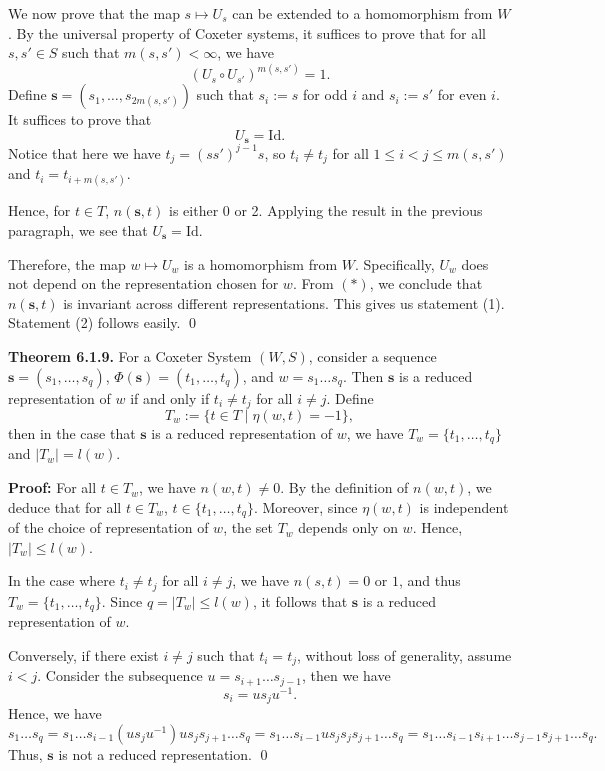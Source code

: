 \documentclass[../main.tex]{subfiles}
\begin{document}
We now prove that the map $s \mapsto U_s$ can be extended to a homomorphism from $W$. By the universal property of Coxeter systems, it suffices to prove that for all $s, s' \in S$ such that $m(s, s') < \infty$, we have
\[
(U_s \circ U_{s'})^{m(s, s')} = 1.
\]
Define $\mathbf{s} = (s_1, \dots, s_{2m(s, s')})$ such that $s_i := s$ for odd $i$ and $s_i := s'$ for even $i$. It suffices to prove that
\[
U_{\mathbf{s}} = \text{Id}.
\]
Notice that here we have $t_j = (ss')^{j-1} s$, so $t_i \neq t_j$ for all $1 \leq i < j \leq m(s, s')$ and $t_i = t_{i + m(s, s')}$.

Hence, for $t \in T$, $n(\mathbf{s}, t)$ is either 0 or 2. Applying the result in the previous paragraph, we see that $U_{\mathbf{s}} = \text{Id}$.

Therefore, the map $w \mapsto U_w$ is a homomorphism from $W$. Specifically, $U_w$ does not depend on the representation chosen for $w$. From $(*)$, we conclude that $n(\mathbf{s}, t)$ is invariant across different representations. This gives us statement (1). Statement (2) follows easily. \qed

\vspace{\baselineskip}

\noindent \textbf{Theorem 6.1.9.} For a Coxeter System $(W,S)$, consider a sequence $\mathbf{s} = (s_1, \dots, s_q)$, $\Phi(\mathbf{s}) = (t_1, \dots, t_q)$, and $w = s_1 \dots s_q$. Then $\mathbf{s}$ is a reduced representation of $w$ if and only if $t_i \neq t_j$ for all $i \neq j$. Define
\[
T_w := \{ t \in T \mid \eta(w, t) = -1 \},
\]
then in the case that $\mathbf{s}$ is a reduced representation of $w$, we have $T_w = \{ t_1, \dots, t_q \}$ and $|T_w| = l(w)$.

\vspace{0.5\baselineskip}

\noindent \textbf{Proof:} For all $t \in T_w$, we have $n(w, t) \neq 0$. By the definition of $n(w, t)$, we deduce that for all $t \in T_w$, $t \in \{ t_1, \dots, t_q \}$. Moreover, since $\eta(w, t)$ is independent of the choice of representation of $w$, the set $T_w$ depends only on $w$. Hence, $|T_w| \leq l(w)$.

In the case where $t_i \neq t_j$ for all $i \neq j$, we have $n(s, t) = 0$ or $1$, and thus $T_w = \{ t_1, \dots, t_q \}$. Since $q = |T_w| \leq l(w)$, it follows that $\mathbf{s}$ is a reduced representation of $w$.

Conversely, if there exist $i \neq j$ such that $t_i = t_j$, without loss of generality, assume $i < j$. Consider the subsequence $u = s_{i+1} \dots s_{j-1}$, then we have
\[
s_i = u s_j u^{-1}.
\]
Hence, we have
\[
s_1 \dots s_q = s_1 \dots s_{i-1} (u s_j u^{-1}) u s_j s_{j+1} \dots s_q = s_1 \dots s_{i-1} u s_j s_j s_{j+1} \dots s_q = s_1 \dots s_{i-1} s_{i+1} \dots s_{j-1} s_{j+1} \dots s_q.
\]
Thus, $\mathbf{s}$ is not a reduced representation. \qed
\end{document}
